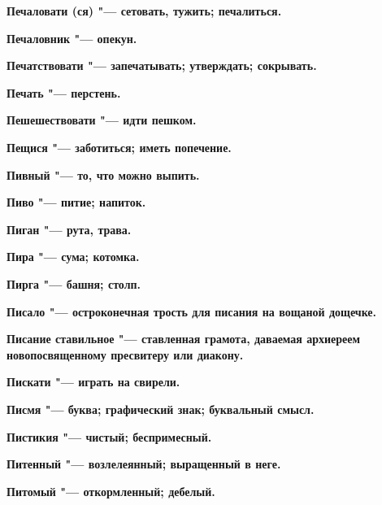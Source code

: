 \begin{mymulticols}{2}
\bfseries Печаловати\normalfont{} (ся) "--- сетовать, тужить; печалиться. 




\bfseries Печаловник\normalfont{} "--- опекун. 




\bfseries Печатствовати\normalfont{} "--- запечатывать; утверждать; сокрывать. 




\bfseries Печать\normalfont{} "--- перстень. 




\bfseries Пешешествовати\normalfont{} "--- идти пешком. 




\bfseries Пещися\normalfont{} "--- заботиться; иметь попечение. 




\bfseries Пивный\normalfont{} "--- то, что можно выпить. 




\bfseries Пиво\normalfont{} "--- питие; напиток. 




\bfseries Пиган\normalfont{} "--- рута, трава. 




\bfseries Пира\normalfont{} "--- сума; котомка. 




\bfseries Пирга\normalfont{} "--- башня; столп. 




\bfseries Писало\normalfont{} "--- остроконечная трость для писания на вощаной дощечке. 




\bfseries Писание ставильное\normalfont{} "--- ставленная грамота, даваемая архиереем новопосвященному пресвитеру или диакону. 




\bfseries Пискати\normalfont{} "--- играть на свирели. 




\bfseries Писмя\normalfont{} "--- буква; графический знак; буквальный смысл. 




\bfseries Пистикия\normalfont{} "--- чистый; беспримесный. 




\bfseries Питенный\normalfont{} "--- возлелеянный; выращенный в неге. 




\bfseries Питомый\normalfont{} "--- откормленный; дебелый. 





\end{mymulticols}
